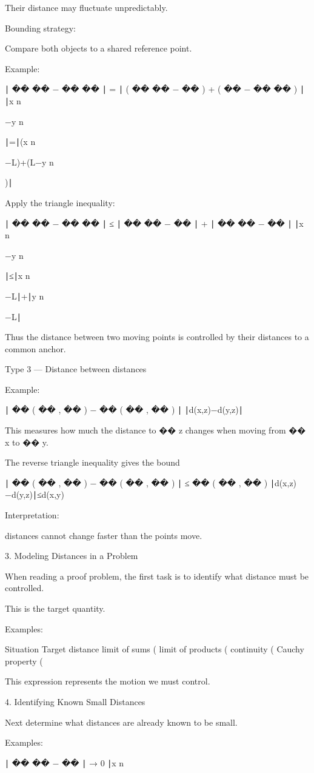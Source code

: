 Their distance may fluctuate unpredictably.

Bounding strategy:

Compare both objects to a shared reference point.

Example:

∣
��
��
−
��
��
∣
=
∣
(
��
��
−
��
)
+
(
��
−
��
��
)
∣
∣x
n
	​

−y
n
	​

∣=∣(x
n
	​

−L)+(L−y
n
	​

)∣

Apply the triangle inequality:

∣
��
��
−
��
��
∣
≤
∣
��
��
−
��
∣
+
∣
��
��
−
��
∣
∣x
n
	​

−y
n
	​

∣≤∣x
n
	​

−L∣+∣y
n
	​

−L∣

Thus the distance between two moving points is controlled by their distances to a common anchor.

Type 3 — Distance between distances

Example:

∣
��
(
��
,
��
)
−
��
(
��
,
��
)
∣
∣d(x,z)−d(y,z)∣

This measures how much the distance to 
��
z changes when moving from 
��
x to 
��
y.

The reverse triangle inequality gives the bound

∣
��
(
��
,
��
)
−
��
(
��
,
��
)
∣
≤
��
(
��
,
��
)
∣d(x,z)−d(y,z)∣≤d(x,y)

Interpretation:

distances cannot change faster than the points move.

3. Modeling Distances in a Problem

When reading a proof problem, the first task is to identify what distance must be controlled.

This is the target quantity.

Examples:

Situation	Target distance
limit of sums	(
limit of products	(
continuity	(
Cauchy property	(

This expression represents the motion we must control.

4. Identifying Known Small Distances

Next determine what distances are already known to be small.

Examples:

∣
��
��
−
��
∣
→
0
∣x
n
	​

